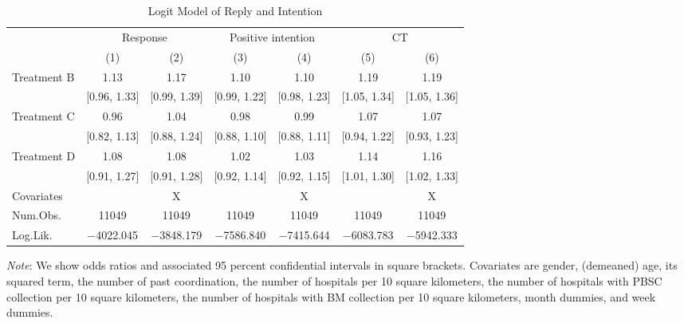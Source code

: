 \documentclass[12pt, a4paper]{article}
\begin{document}
\begin{table}[H]

\caption{\label{tab:stock-logit}Logit Model of Reply and Intention}
\centering
\fontsize{9}{11}\selectfont
\begin{threeparttable}
\begin{tabular}[t]{lcccccc}
\toprule
\multicolumn{1}{c}{ } & \multicolumn{2}{c}{Response} & \multicolumn{2}{c}{Positive intention} & \multicolumn{2}{c}{CT} \\
\cmidrule(l{3pt}r{3pt}){2-3} \cmidrule(l{3pt}r{3pt}){4-5} \cmidrule(l{3pt}r{3pt}){6-7}
  & (1) & (2) & (3) & (4) & (5) & (6)\\
\midrule
Treatment B & \num{1.13} & \num{1.17} & \num{1.10} & \num{1.10} & \num{1.19} & \num{1.19}\\
 & {}[\num{0.96}, \num{1.33}] & {}[\num{0.99}, \num{1.39}] & {}[\num{0.99}, \num{1.22}] & {}[\num{0.98}, \num{1.23}] & {}[\num{1.05}, \num{1.34}] & {}[\num{1.05}, \num{1.36}]\\
Treatment C & \num{0.96} & \num{1.04} & \num{0.98} & \num{0.99} & \num{1.07} & \num{1.07}\\
 & {}[\num{0.82}, \num{1.13}] & {}[\num{0.88}, \num{1.24}] & {}[\num{0.88}, \num{1.10}] & {}[\num{0.88}, \num{1.11}] & {}[\num{0.94}, \num{1.22}] & {}[\num{0.93}, \num{1.23}]\\
Treatment D & \num{1.08} & \num{1.08} & \num{1.02} & \num{1.03} & \num{1.14} & \num{1.16}\\
 & {}[\num{0.91}, \num{1.27}] & {}[\num{0.91}, \num{1.28}] & {}[\num{0.92}, \num{1.14}] & {}[\num{0.92}, \num{1.15}] & {}[\num{1.01}, \num{1.30}] & {}[\num{1.02}, \num{1.33}]\\
\midrule
Covariates &  & X &  & X &  & X\\
Num.Obs. & \num{11049} & \num{11049} & \num{11049} & \num{11049} & \num{11049} & \num{11049}\\
Log.Lik. & \num{-4022.045} & \num{-3848.179} & \num{-7586.840} & \num{-7415.644} & \num{-6083.783} & \num{-5942.333}\\
\bottomrule
\end{tabular}
\begin{tablenotes}
\item \emph{Note}: We show odds ratios and associated 95 percent confidential intervals in square brackets. Covariates are gender, (demeaned) age, its squared term, the number of past coordination, the number of hospitals per 10 square kilometers, the number of hospitals with PBSC collection per 10 square kilometers, the number of hospitals with BM collection per 10 square kilometers, month dummies, and week dummies.
\end{tablenotes}
\end{threeparttable}
\end{table}
\end{document}
